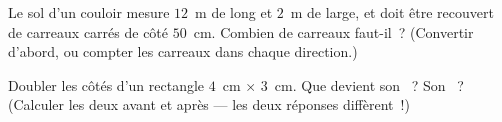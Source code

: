 \begin{exercise}[$\star\star$]\label{exo:g5:areas:10}
Le sol d'un couloir mesure $12$~m de long et $2$~m de large, et
doit être recouvert de carreaux carrés de côté $50$~cm. Combien de
carreaux faut-il~? (Convertir d'abord, ou compter les carreaux dans
chaque direction.)
\end{exercise}

\begin{exercise}[$\star\star$]\label{exo:g5:areas:11}
Doubler les côtés d'un rectangle $4$~cm $\times$ $3$~cm. Que
devient son ~? Son ~? (Calculer les deux avant et
après --- les deux réponses diffèrent~!)
\end{exercise}
